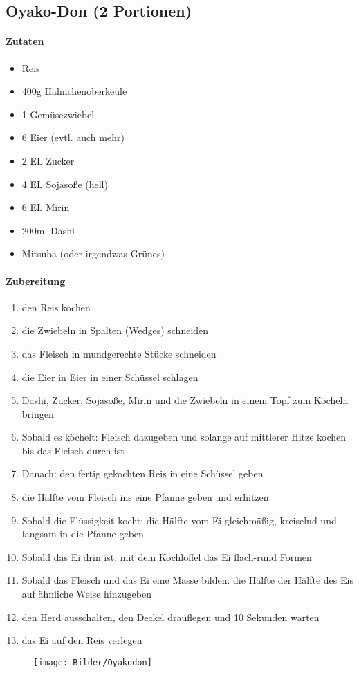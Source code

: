 \newpage
\subsection{Oyako-Don (2 Portionen)}
\paragraph{Zutaten}
\begin{itemize}[noitemsep]
	\item Reis
	\item 400g Hähnchenoberkeule
	\item 1 Gemüsezwiebel
	\item 6 Eier (evtl. auch mehr)
	\item 2 EL Zucker
	\item 4 EL Sojasoße (hell)
	\item 6 EL Mirin
	\item 200ml Dashi
	\item Mitsuba (oder irgendwas Grünes)
\end{itemize}
\paragraph{Zubereitung}
\begin{enumerate}[noitemsep]
	\item den Reis kochen
	\item die Zwiebeln in Spalten (Wedges) schneiden 
	\item das Fleisch in mundgerechte Stücke schneiden
	\item die Eier in Eier in einer Schüssel schlagen
	\item Dashi, Zucker, Sojasoße, Mirin und die Zwiebeln in einem Topf zum Köcheln bringen
	\item Sobald es köchelt: Fleisch dazugeben und solange auf mittlerer Hitze kochen bis das Fleisch durch ist 
	\item Danach: den fertig gekochten Reis in eine Schüssel geben
	\item die Hälfte vom Fleisch ins eine Pfanne geben und erhitzen
	\item Sobald die Flüssigkeit kocht: die Hälfte vom Ei gleichmäßig, kreiselnd und langsam in die Pfanne geben 
	\item Sobald das Ei drin ist: mit dem Kochlöffel das Ei flach-rund Formen 
	\item Sobald das Fleisch und das Ei eine Masse bilden: die Hälfte der Hälfte des Eis auf ähnliche Weise hinzugeben
	\item den Herd ausschalten, den Deckel drauflegen und 10 Sekunden warten 
	\item das Ei auf den Reis verlegen 
\end{enumerate}
\begin{figure}[h]
\centering
\texttt{[image: Bilder/Oyakodon]}
\end{figure}